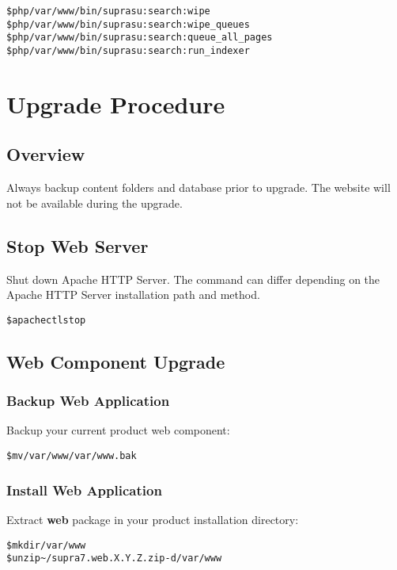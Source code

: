 \documentclass[12pt]{article}
\newcommand{\vigPackageName}{supra7}
\newcommand{\vigPathToProject}{/var/www}
\newcommand{\vigReleasePath}{\textasciitilde/}
\newcommand{\vigReleaseVersion}{X.Y.Z}
\begin{document}
\begin{alltt}
\$ php \vigPathToProject/bin/supra su:search:wipe
\$ php \vigPathToProject/bin/supra su:search:wipe_queues
\$ php \vigPathToProject/bin/supra su:search:queue_all_pages
\$ php \vigPathToProject/bin/supra su:search:run_indexer
\end{alltt}

\section{Upgrade Procedure}

\subsection{Overview}
Always backup content folders and database prior to upgrade. The website will not be available during the upgrade.

\subsection{Stop Web Server}
Shut down Apache HTTP Server. The command can differ depending on the Apache HTTP Server installation path and method.

\begin{alltt}
\$ apachectl stop
\end{alltt}

\subsection{Web Component Upgrade}

\subsubsection{Backup Web Application}
Backup your current product web component:

\begin{alltt}
\$ mv \vigPathToProject \vigPathToProject.bak
\end{alltt}

\subsubsection{Install Web Application}
Extract \textbf{web} package in your product installation directory:

\begin{alltt}
\$ mkdir \vigPathToProject
\$ unzip {\vigReleasePath}{\vigPackageName}.web.\vigReleaseVersion.zip -d \vigPathToProject
\end{alltt}
\end{document}
